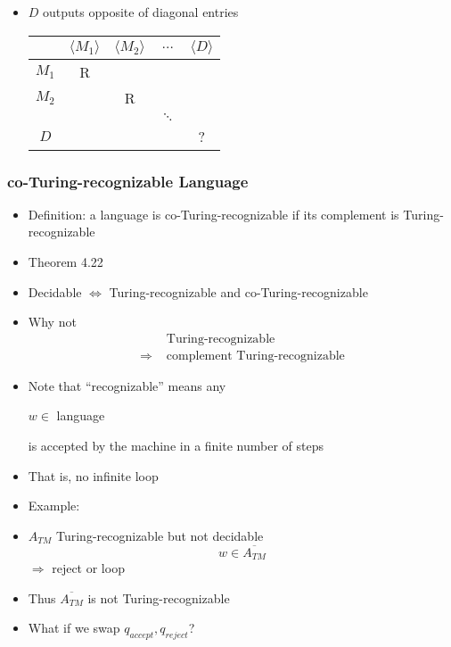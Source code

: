 \begin{frame}[allowframebreaks]
\begin{itemize}
\item $D$ outputs \alert{opposite of diagonal entries}
  \begin{center}
    \begin{tabular}{c|cccc}
& $\langle  M_1\rangle $ & $\langle  M_2\rangle $ & $\ldots$ & $\langle  D\rangle $\\ \hline
$M_1$ & R & &&\\
$M_2$ &  & R && \\
&& & $\ddots$ & \\
$D$ &&&& ?
    \end{tabular}
  \end{center}

\end{itemize}\end{frame} \begin{frame}[allowframebreaks] \frametitle{co-Turing-recognizable Language}
  \begin{itemize}
\item Definition: a language is co-Turing-recognizable
if its complement is Turing-recognizable
\item Theorem 4.22
\item[] Decidable $\Leftrightarrow$
Turing-recognizable and co-Turing-recognizable
\item Why not
  \begin{equation*}
    \begin{split}
&   \text{ Turing-recognizable} \\
\Rightarrow & \text{ complement Turing-recognizable}
\end{split}
\end{equation*}
\item Note that ``recognizable'' means any
  \begin{center}
  $w \in $ language
\end{center}
is accepted by the machine in \alert{a finite number of steps}
\item That is, no infinite loop
\item Example:
\item [] $A_{TM}$ Turing-recognizable but not decidable
  \begin{equation*}
    w \in \overline{A_{TM}}
  \end{equation*}
  $\Rightarrow$ reject or loop

  
\item [] Thus $\overline{A_{TM}}$ is not Turing-recognizable

\item What if we swap $q_{accept},q_{reject}$?


\end{itemize}
\end{frame}
